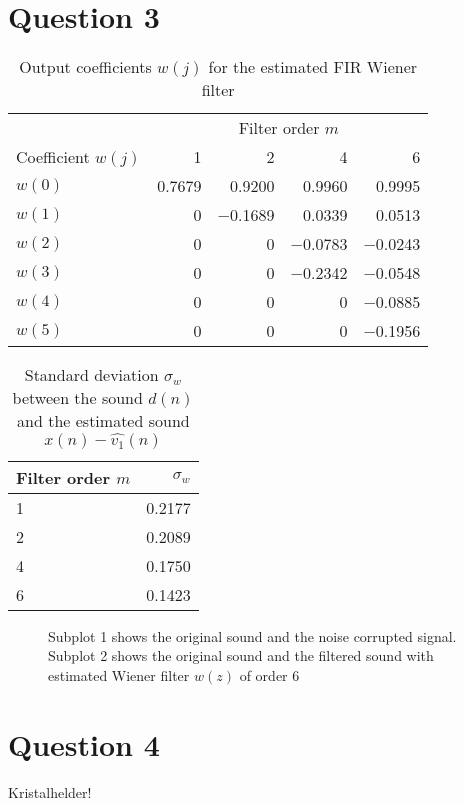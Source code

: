\documentclass[12pt,a4paper]{article}
\begin{document}
\clearpage\section*{Question 3}

\begin{table}[h!]
\centering
\caption{Output coefficients $w(j)$ for the estimated FIR Wiener filter}
\begin{tabular}{l r r r r}
\hline
 & \multicolumn{4}{c}{Filter order $m$}\\
 \cline{2-5}
Coefficient $w(j)$ & \num{1} & \num{2} & \num{4} & \num{6} \\
\hline
$w(0)$ & \num{0.7679} & \num{0.9200}& \num{0.9960} & \num{0.9995} \\
$w(1)$ & \num{0} & \num{-0.1689}& \num{0.0339}& \num{0.0513} \\
$w(2)$ & \num{0}& \num{0}& \num{-0.0783}& \num{-0.0243}\\
$w(3)$ & \num{0}& \num{0}& \num{-0.2342}& \num{-0.0548}\\
$w(4)$ & \num{0}& \num{0}& \num{0}& \num{-0.0885}\\
$w(5)$ & \num{0}& \num{0}& \num{0}& \num{-0.1956}\\
\hline
\end{tabular}
\end{table}

\begin{table}[h!]
\centering
\caption{Standard deviation $\sigma_{w}$ between the sound $d(n)$ and the estimated sound $x(n) - \hat{v_{1}}(n)$}
\begin{tabular}{l | r}
Filter order $m$ & $\sigma_{w}$ \\
\hline
\num{1} & \num{0.2177}\\
\num{2} & \num{0.2089}\\
\num{4} & \num{0.1750}\\
\num{6} & \num{0.1423}\\
\hline
\end{tabular}
\end{table}

\begin{figure}[h!]
\centering

\caption{Subplot 1 shows the original sound and the noise corrupted signal. Subplot 2 shows the original sound and the filtered sound with estimated Wiener filter $w(z)$ of order \num{6}}
\end{figure}

\clearpage\section*{Question 4}
Kristalhelder!
\end{document}
